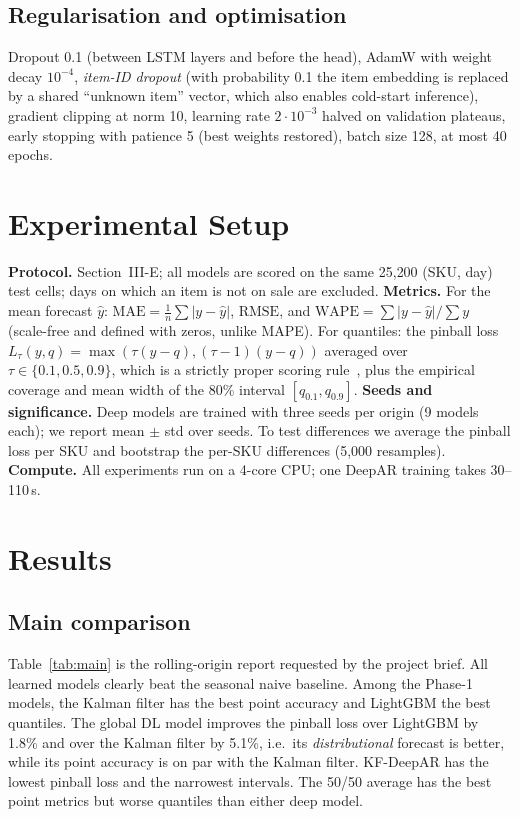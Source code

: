 \documentclass[conference]{IEEEtran}
\begin{document}
\subsection{Regularisation and optimisation}
Dropout 0.1 (between LSTM layers and before the head), AdamW with weight decay $10^{-4}$, \emph{item-ID dropout} (with probability 0.1 the
item embedding is replaced by a shared ``unknown item'' vector, which also enables cold-start inference), gradient clipping at norm 10,
learning rate $2\cdot10^{-3}$ halved on validation plateaus, early stopping with patience 5 (best weights restored), batch size 128,
at most 40 epochs.

\section{Experimental Setup}
\textbf{Protocol.} Section~III-E; all models are scored on the same 25{,}200 (SKU, day) test cells; days on which an item is not on sale are excluded.
\textbf{Metrics.} For the mean forecast $\hat y$: $\text{MAE}=\frac1n\sum|y-\hat y|$, $\text{RMSE}$, and $\text{WAPE}=\sum|y-\hat y|/\sum y$
(scale-free and defined with zeros, unlike MAPE). For quantiles: the pinball loss $L_\tau(y,q)=\max(\tau(y-q),(\tau-1)(y-q))$ averaged over
$\tau\in\{0.1,0.5,0.9\}$, which is a strictly proper scoring rule~\cite{gneiting2007proper}, plus the empirical coverage and mean width of the
80\% interval $[q_{0.1},q_{0.9}]$.
\textbf{Seeds and significance.} Deep models are trained with three seeds per origin (9 models each); we report mean $\pm$ std over seeds.
To test differences we average the pinball loss per SKU and bootstrap the per-SKU differences (5{,}000 resamples).
\textbf{Compute.} All experiments run on a 4-core CPU; one DeepAR training takes 30--110\,s.

\section{Results}
\subsection{Main comparison}
Table~\ref{tab:main} is the rolling-origin report requested by the project brief.
All learned models clearly beat the seasonal naive baseline. Among the Phase-1 models, the Kalman filter has the best point accuracy and LightGBM the
best quantiles. The global DL model improves the pinball loss over LightGBM by 1.8\% and over the Kalman filter by 5.1\%, i.e.\ its
\emph{distributional} forecast is better, while its point accuracy is on par with the Kalman filter. KF-DeepAR has the lowest pinball loss and
the narrowest intervals. The 50/50 average has the best point metrics but worse quantiles than either deep model.
\end{document}
